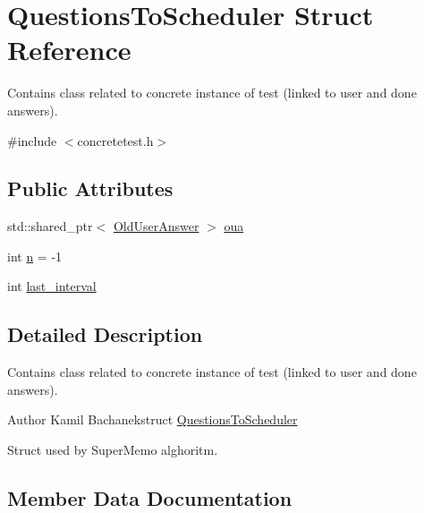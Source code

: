 \hypertarget{struct_questions_to_scheduler}{}\section{Questions\+To\+Scheduler Struct Reference}
\label{struct_questions_to_scheduler}


Contains class related to concrete instance of test (linked to user and done answers).  




{\ttfamily \#include $<$concretetest.\+h$>$}

\subsection*{Public Attributes}
\begin{DoxyCompactItemize}
\item 
std\+::shared\+\_\+ptr$<$ \hyperlink{class_old_user_answer}{Old\+User\+Answer} $>$ \hyperlink{struct_questions_to_scheduler_ae48fc05cb9de46b9db8b9868855d386d}{oua}
\item 
int \hyperlink{struct_questions_to_scheduler_a113956e9ee3927ec46b7680bf796a1bc}{n} = -\/1
\item 
int \hyperlink{struct_questions_to_scheduler_a12af845ec18cf5d7738de0e11ec14971}{last\+\_\+interval}
\end{DoxyCompactItemize}


\subsection{Detailed Description}
Contains class related to concrete instance of test (linked to user and done answers). 

\begin{DoxyAuthor}{Author}
Kamil Bachanekstruct \hyperlink{struct_questions_to_scheduler}{Questions\+To\+Scheduler}
\end{DoxyAuthor}
Struct used by Super\+Memo alghoritm. 

\subsection{Member Data Documentation}
\mbox{\label{struct_questions_to_scheduler_a12af845ec18cf5d7738de0e11ec14971}} 
